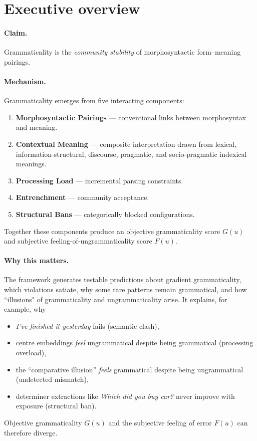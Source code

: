 \documentclass[12pt]{article}
\begin{document}
\section{Executive overview}

\paragraph*{Claim.}%
Grammaticality is the \emph{community stability} of morphosyntactic form–meaning pairings.

\paragraph*{Mechanism.}%
Grammaticality emerges from five interacting components:

\begin{enumerate}
    \item \textbf{Morphosyntactic Pairings} — conventional links between morphosyntax and meaning.
    \item \textbf{Contextual Meaning} — composite interpretation drawn from lexical, information-structural, discourse, pragmatic, and socio-pragmatic indexical meanings.
    \item \textbf{Processing Load} — incremental parsing constraints.
    \item \textbf{Entrenchment} — community acceptance.
    \item \textbf{Structural Bans} — categorically blocked configurations.
\end{enumerate}

Together these components produce an objective grammaticality score \(G(u)\) and subjective feeling-of-ungrammaticality score \(F(u)\).

\paragraph*{Why this matters.}%
The framework generates testable predictions about gradient grammaticality, which violations satiate, why some rare patterns remain grammatical, and how ``illusions" of grammaticality and ungrammaticality arise. It explains, for example, why
\begin{itemize}
    \item \textit{I've finished it yesterday} fails (semantic clash),  
    \item centre embeddings \emph{feel} ungrammatical despite being grammatical (processing overload),
    \item the ``comparative illusion'' \emph{feels} grammatical despite being ungrammatical (undetected mismatch),
    \item determiner extractions like \textit{Which did you buy car?} never improve with exposure (structural ban).
\end{itemize}
Objective grammaticality \(G(u)\) and the subjective feeling of error \(F(u)\) can therefore diverge.
\end{document}

